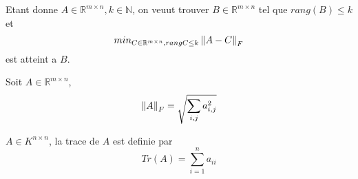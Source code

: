 \documentclass[../main.tex]{subfiles}
\begin{document}
Etant donne $A \in \mathbb{R}^{m\times n}, k \in \mathbb{N}$, on veuut trouver $B\in \mathbb{R}^{m\times n}$ tel que $rang( B) \leq k$ et
\[ 
min_{C\in \mathbb{R}^{m\times n}, rang C \leq k} \left\lVert A-C\right\rVert _F
\]
est atteint a $B$.\\
\begin{defn}
	Soit $A \in \mathbb{R}^{m\times n}$,
	\[ 
		\left\lVert A\right\rVert _F =\sqrt{  \sum_{i,j} a_{i,j} ^{2} }
	\]
		
\end{defn}
\begin{defn}[Trace]
	$A \in K^{n\times n}$, la trace de $A$ est definie par
	\[ 
		Tr( A) = \sum_{i=1}^{ n}a_{ii} 
	\]
	
\end{defn}
\end{document}
